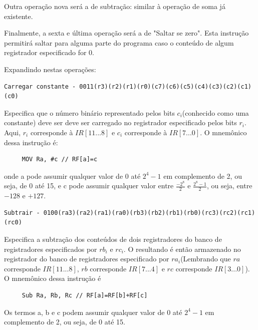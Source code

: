 \documentclass{article}
\begin{document}
Outra operação nova será a de subtração: similar à operação de soma já existente.

Finalmente, a sexta e última operação será a de "Saltar se zero". Esta instrução permitirá saltar para alguma parte do programa caso o conteúdo de algum registrador especificado for 0.

Expandindo nestas operações:

\begin{boxedd}
\begin{lstlisting}
Carregar constante - 0011(r3)(r2)(r1)(r0)(c7)(c6)(c5)(c4)(c3)(c2)(c1)(c0)
\end{lstlisting}    
Especifica que o número binário representado pelos bits $c_i$(conhecido como uma constante) deve ser deve ser carregado no registrador especificado pelos bits $r_i$. Aqui, $r_i$ corresponde à $IR[11...8]$ e $c_i$ corresponde à $IR[7...0]$. O mnemônico dessa instrução é:
\begin{lstlisting}
     MOV Ra, #c // RF[a]=c     
\end{lstlisting}
onde a pode assumir qualquer valor de 0 até $2^4 - 1$ em complemento de 2, ou seja, de 0 até 15, e c pode assumir qualquer valor entre $\frac{-2^8}{2}$ e $\frac{2^8-1}{2}$, ou seja, entre $-128$ e $+127$.
\end{boxedd}


\begin{boxedd}
\begin{lstlisting}
Subtrair - 0100(ra3)(ra2)(ra1)(ra0)(rb3)(rb2)(rb1)(rb0)(rc3)(rc2)(rc1)(rc0)
\end{lstlisting}    
Especifica a subtração dos conteúdos de dois registradores do banco de registradores especificados por $rb_i$ e $rc_i$. O resultando é então armazenado no registrador do banco de registradores especificado por $ra_i$(Lembrando que $ra$ corresponde $IR[11...8]$, $rb$ corresponde $IR[7...4]$ e $rc$ corresponde $IR[3...0]$). O mnemônico dessa instrução é
\begin{lstlisting}
     Sub Ra, Rb, Rc // RF[a]=RF[b]+RF[c]     
\end{lstlisting}
Os termos a, b e c podem assumir qualquer valor de 0 até $2^4 - 1$ em complemento de 2, ou seja, de 0 até 15. 
\end{boxedd}
\end{document}
